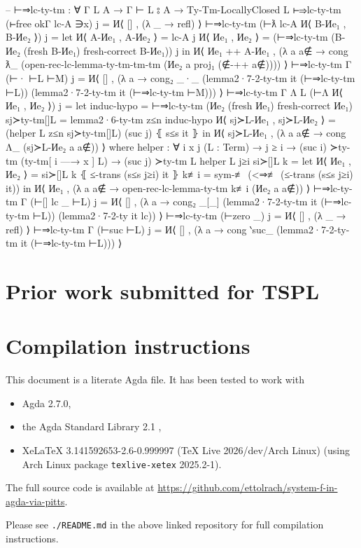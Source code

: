 \documentclass[logo,bsc,singlespacing,parskip,online]{infthesis}
\begin{document}
\begin{code}
  -- ⊢⇒lc-ty-tm : ∀ {Γ L A} → Γ ⊢ L ⦂ A → Ty-Tm-LocallyClosed L
  ⊢⇒lc-ty-tm (⊢free okΓ lc-A ∋x) j = И⟨ [] , (λ _ → refl) ⟩
  ⊢⇒lc-ty-tm (⊢ƛ lc-A И⟨ B-Иe₁ , B-Иe₂ ⟩) j =
    let И⟨ A-Иe₁ , A-Иe₂ ⟩ = lc-A j
        И⟨ Иe₁ , Иe₂ ⟩ = (⊢⇒lc-ty-tm (B-Иe₂ (fresh B-Иe₁) {fresh-correct B-Иe₁})) j
    in И⟨ Иe₁ ++ A-Иe₁ , (λ a {a∉} → cong ƛ_
      (open-rec-lc-lemma-ty-tm-tm-tm (Иe₂ a {proj₁ (∉-++ a∉)}))) ⟩
  ⊢⇒lc-ty-tm {Γ} (⊢· ⊢L ⊢M) j = И⟨ [] , (λ a → cong₂ _·_
    (lemma2·7-2-ty-tm it (⊢⇒lc-ty-tm ⊢L))
    (lemma2·7-2-ty-tm it (⊢⇒lc-ty-tm ⊢M))) ⟩
  ⊢⇒lc-ty-tm {Γ} {Λ L} (⊢Λ И⟨ Иe₁ , Иe₂ ⟩) j =
      let induc-hypo = ⊢⇒lc-ty-tm (Иe₂ (fresh Иe₁) {fresh-correct Иe₁})
          sj≻ty-tm[]L = lemma2·6-ty-tm z≤n induc-hypo
          И⟨ sj≻L-Иe₁ , sj≻L-Иe₂ ⟩ = (helper L z≤n sj≻ty-tm[]L) (suc j) ⦃ s≤s it ⦄
      in И⟨ sj≻L-Иe₁ , (λ a {a∉} → cong Λ_ (sj≻L-Иe₂ a {a∉})) ⟩
    where
      helper : ∀ {i x j} (L : Term) → j ≥ i → (suc i) ≻ty-tm (ty-tm[ i —→ x ] L) → (suc j) ≻ty-tm L
      helper L j≥i si≻[]L k =
        let И⟨ Иe₁ , Иe₂ ⟩ = si≻[]L k ⦃ ≤-trans (s≤s j≥i) it ⦄
            k≢i = sym-≢ (<⇒≢ (≤-trans (s≤s j≥i) it))
        in И⟨ Иe₁ , (λ a {a∉} → open-rec-lc-lemma-ty-tm k≢i (Иe₂ a {a∉})) ⟩
  ⊢⇒lc-ty-tm {Γ} (⊢[] lc _ ⊢L) j = И⟨ [] , (λ a → cong₂ _[_]
    (lemma2·7-2-ty-tm it (⊢⇒lc-ty-tm ⊢L))
    (lemma2·7-2-ty it lc)) ⟩
  ⊢⇒lc-ty-tm (⊢zero _) j = И⟨ [] , (λ _ → refl) ⟩
  ⊢⇒lc-ty-tm {Γ} (⊢suc ⊢L) j = И⟨ [] , (λ a →
    cong ‵suc_ (lemma2·7-2-ty-tm it (⊢⇒lc-ty-tm ⊢L))) ⟩
\end{code}

\chapter{Prior work submitted for TSPL}
\label{appendix:tspl}


\chapter{Compilation instructions}
\label{appendix:compilation_instructions}

This document is a literate Agda file. It has been tested to work with
\begin{itemize}
  \item Agda 2.7.0,

  \item the Agda Standard Library 2.1 \citep{the_agda_community_agda_2024},

  \item XeLaTeX 3.141592653-2.6-0.999997 (TeX Live 2026/dev/Arch Linux) (using Arch Linux package
  \texttt{texlive-xetex} 2025.2-1).
\end{itemize}

The full source code is available at \url{https://github.com/ettolrach/system-f-in-agda-via-pitts}.

Please see \texttt{./README.md} in the above linked repository for full compilation instructions.
\end{document}
